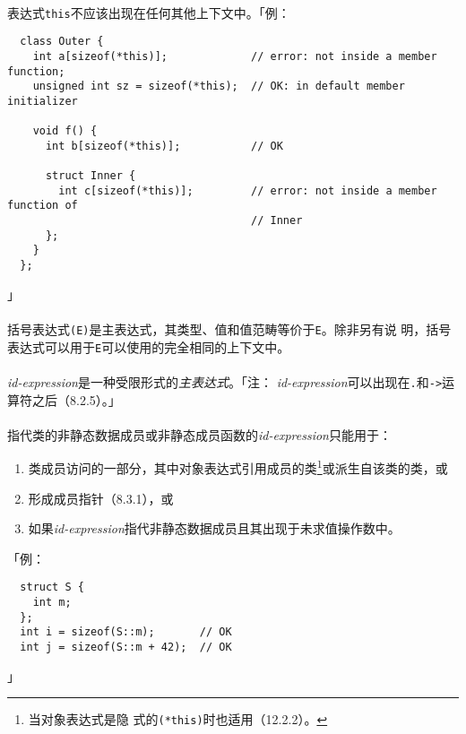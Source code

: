 \paragraph{}
表达式\texttt{this}不应该出现在任何其他上下文中。「例：
\begin{lstlisting}
  class Outer {
    int a[sizeof(*this)];             // error: not inside a member function;
    unsigned int sz = sizeof(*this);  // OK: in default member initializer

    void f() {
      int b[sizeof(*this)];           // OK

      struct Inner {
        int c[sizeof(*this)];         // error: not inside a member function of
                                      // Inner
      };
    }
  };
\end{lstlisting}」

\paragraph{}
括号表达式\texttt{(E)}是主表达式，其类型、值和值范畴等价于\texttt{E}。除非另有说
明，括号表达式可以用于\texttt{E}可以使用的完全相同的上下文中。


\paragraph{}
\textit{id-expression}是一种受限形式的\textit{主表达式}。「注：
\textit{id-expression}可以出现在\texttt{.}和\texttt{->}运算符之后（8.2.5）。」

\paragraph{}
指代类的非静态数据成员或非静态成员函数的\textit{id-expression}只能用于：
\begin{enumerate}
  \item{类成员访问的一部分，其中对象表达式引用成员的类\footnote{当对象表达式是隐
    式的\texttt{(*this)}时也适用（12.2.2）。}或派生自该类的类，或}
  \item{形成成员指针（8.3.1），或}
  \item{如果\textit{id-expression}指代非静态数据成员且其出现于未求值操作数中。}
\end{enumerate}
「例：
\begin{lstlisting}
  struct S {
    int m;
  };
  int i = sizeof(S::m);       // OK
  int j = sizeof(S::m + 42);  // OK
\end{lstlisting}」

